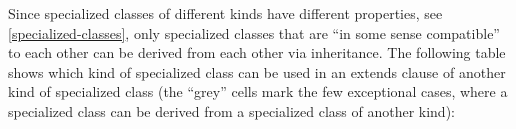 Since specialized classes of different kinds have different properties,
see \autoref{specialized-classes}, only specialized classes that are ``in some sense
compatible'' to each other can be derived from each other via
inheritance. The following table shows which kind of specialized class
can be used in an extends clause of another kind of specialized class
(the ``grey'' cells mark the few exceptional cases, where a specialized
class can be derived from a specialized class of another kind):


\begin{table}[H]
  \ifpdf{}
\end{table}
